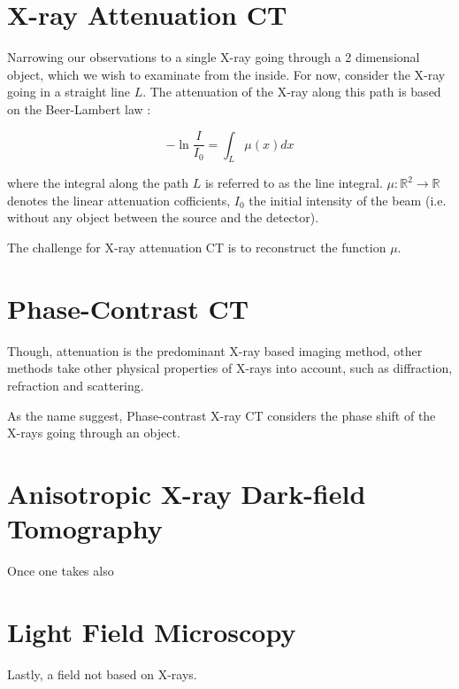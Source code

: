 
\section{X-ray Attenuation CT}


Narrowing our observations to a single X-ray going through a 2 dimensional object, which we wish to
examinate from the inside. For now, consider the X-ray going in a straight line \(L\). The
attenuation of the X-ray along this path is based on the Beer-Lambert law \cite{buzug_computed_2008}:

\begin{equation}
    \label{eq:beer-Lambert-law}
    - \ln \frac{I}{I_0} = \int_L \mu (x) dx
\end{equation}

where the integral along the path \(L\) is referred to as the line integral.
\(\mu \colon \mathbb{R}^2 \to \mathbb{R}\) denotes the linear attenuation cofficients, \(I_0\)
the initial intensity of the beam (i.e. without any object between the source and the detector).

The challenge for X-ray attenuation CT is to reconstruct the function \(\mu\).

\section{Phase-Contrast CT}

Though, attenuation is the predominant X-ray based imaging method, other methods take other physical
properties of X-rays into account, such as diffraction, refraction and scattering.

As the name suggest, Phase-contrast X-ray CT considers the phase shift of the X-rays going through
an object.

\section{Anisotropic X-ray Dark-field Tomography}

Once one takes also

\section{Light Field Microscopy}

Lastly, a field not based on X-rays.



